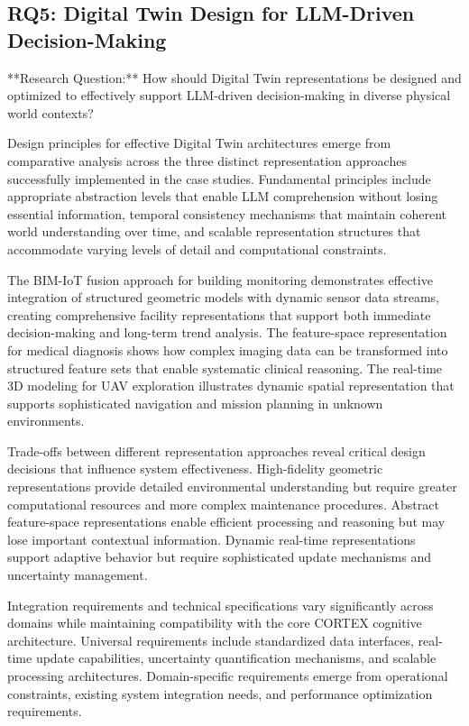 \subsection{RQ5: Digital Twin Design for LLM-Driven Decision-Making}

**Research Question:** How should Digital Twin representations be designed and optimized to effectively support LLM-driven decision-making in diverse physical world contexts?

Design principles for effective Digital Twin architectures emerge from comparative analysis across the three distinct representation approaches successfully implemented in the case studies. Fundamental principles include appropriate abstraction levels that enable LLM comprehension without losing essential information, temporal consistency mechanisms that maintain coherent world understanding over time, and scalable representation structures that accommodate varying levels of detail and computational constraints.

The BIM-IoT fusion approach for building monitoring demonstrates effective integration of structured geometric models with dynamic sensor data streams, creating comprehensive facility representations that support both immediate decision-making and long-term trend analysis. The feature-space representation for medical diagnosis shows how complex imaging data can be transformed into structured feature sets that enable systematic clinical reasoning. The real-time 3D modeling for UAV exploration illustrates dynamic spatial representation that supports sophisticated navigation and mission planning in unknown environments.

Trade-offs between different representation approaches reveal critical design decisions that influence system effectiveness. High-fidelity geometric representations provide detailed environmental understanding but require greater computational resources and more complex maintenance procedures. Abstract feature-space representations enable efficient processing and reasoning but may lose important contextual information. Dynamic real-time representations support adaptive behavior but require sophisticated update mechanisms and uncertainty management.

Integration requirements and technical specifications vary significantly across domains while maintaining compatibility with the core CORTEX cognitive architecture. Universal requirements include standardized data interfaces, real-time update capabilities, uncertainty quantification mechanisms, and scalable processing architectures. Domain-specific requirements emerge from operational constraints, existing system integration needs, and performance optimization requirements.

